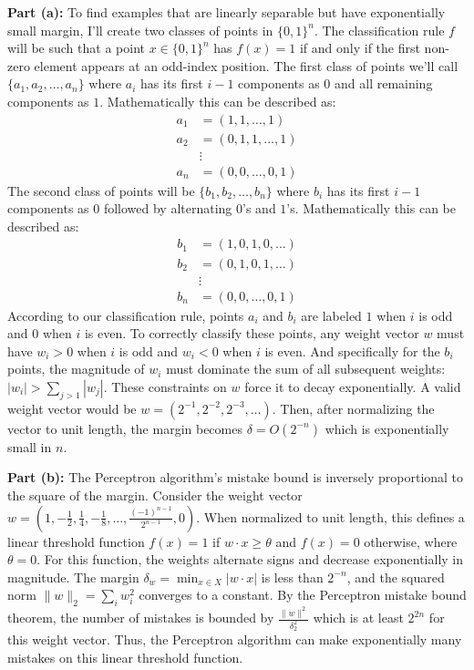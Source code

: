 \documentclass[11pt]{article}
\DeclareMathOperator{\1}{\mathbbm{1}}
\begin{document}
\begin{problem}[15 points]
\textbf{Part (a):} To find examples that are linearly separable but have exponentially small margin, I'll create two classes of points in $\{0,1\}^n$. The classification rule $f$ will be such that a point $x \in \{0,1\}^n$ has $f(x)=1$ if and only if the first non-zero element appears at an odd-index position. The first class of points we'll call $\{a_1, a_2, \ldots, a_n\}$ where $a_i$ has its first $i-1$ components as $0$ and all remaining components as $1$. Mathematically this can be described as:
\begin{align}
	a_1 &= (1,1,\ldots,1) \\
	a_2 &= (0,1,1,\ldots,1) \\
	&\vdots \\
	a_n &= (0,0,\ldots,0,1)
\end{align}
The second class of points will be $\{b_1, b_2, \ldots, b_n\}$ where $b_i$ has its first $i-1$ components as $0$ followed by alternating $0$'s and $1$'s. Mathematically this can be described as:
\begin{align}
	b_1 &= (1,0,1,0,\ldots) \\
	b_2 &= (0,1,0,1,\ldots) \\
	&\vdots \\
	b_n &= (0,0,\ldots,0,1)
\end{align}
According to our classification rule, points $a_i$ and $b_i$ are labeled $1$ when $i$ is odd and $0$ when $i$ is even. To correctly classify these points, any weight vector $w$ must have $w_i > 0$ when $i$ is odd and $w_i < 0$ when $i$ is even. And specifically for the $b_i$ points, the magnitude of $w_i$ must dominate the sum of all subsequent weights: $|w_i| > \sum_{j>1} |w_j|$. These constraints on $w$ force it to decay exponentially. A valid weight vector would be $w = (2^{-1}, 2^{-2}, 2^{-3}, \ldots)$. Then, after normalizing the vector to unit length, the margin becomes $\delta = O(2^{-n})$ which is exponentially small in $n$.

\textbf{Part (b):} The Perceptron algorithm's mistake bound is inversely proportional to the square of the margin. Consider the weight vector $w = \left(1, -\frac{1}{2}, \frac{1}{4}, -\frac{1}{8}, \ldots, \frac{(-1)^{n-1}}{2^{n-1}}, 0\right)$. When normalized to unit length, this defines a linear threshold function $f(x) = 1$ if $w \cdot x \geq \theta$ and $f(x) = 0$ otherwise, where $\theta = 0$. For this function, the weights alternate signs and decrease exponentially in magnitude. The margin $\delta_w = \min_{x \in X} |w \cdot x|$ is less than $2^{-n}$, and the squared norm $\|w\|_2 = \sum_i w_i^2$ converges to a constant. By the Perceptron mistake bound theorem, the number of mistakes is bounded by $\frac{\|w\|^2}{\delta_2^2}$ which is at least $2^{2n}$ for this weight vector. Thus, the Perceptron algorithm can make exponentially many mistakes on this linear threshold function.
\end{problem}
\end{document}
